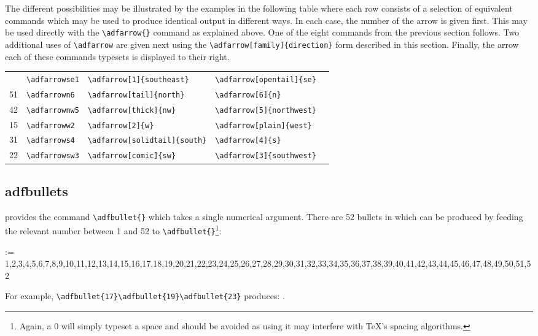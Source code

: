 \documentclass[10pt,british]{article}
\makeatletter
\newcommand{\adfsymset}{%
1,2,3,4,5,6,7,8,9,10,11,12,13,14,15,16,17,18,19,20,21,22,23,24,25,26,27,28,29,30,31,32,33,34,35,36,37,38,39,40,41,42,43,44,45,46,47,48,49,50,51,52}
\newcommand{\adfbulletshow}{%
	\def\tempa{52}%
	\@for \xx:=\adfsymset \do {%
		\ifx\tempa\xx
			\xx: \adfbullet{\xx}%
		\else
			\xx:	 \adfbullet{\xx}\\%
		\fi}}
\makeatother
\begin{document}
The different possibilities may be illustrated by the examples in the following table where each row consists of a selection of equivalent commands which may be used to produce identical output in different ways. In each case, the number of the arrow is given first. This may be used directly with the \verb|\adfarrow{}| command as explained above. One of the eight commands from the previous section follows. Two additional uses of \verb|\adfarrow| are given next using the \verb|\adfarrow[family]{direction}| form described in this section. Finally, the arrow each of these commands typesets is displayed to their right.
\begin{longtable}{lllll}
	\toprule\endhead
	\bottomrule\endfoot
		4	&	\verb|\adfarrowse1|	&	\verb|\adfarrow[1]{southeast}|				&	\verb|\adfarrow[opentail]{se}|		&	\adfarrow[opentail]{se}\\
		51	&	\verb|\adfarrown6|		&	\verb|\adfarrow[tail]{north}|				&	\verb|\adfarrow[6]{n}|						&	\adfarrow[6]{n}\\
		42	&	\verb|\adfarrownw5|	&	\verb|\adfarrow[thick]{nw}|					&	\verb|\adfarrow[5]{northwest}|		&	\adfarrow[5]{northwest}\\
		15	&	\verb|\adfarroww2|		&	\verb|\adfarrow[2]{w}|								&	\verb|\adfarrow[plain]{west}|		&	\adfarrow[plain]{west}\\
		31	&	\verb|\adfarrows4|		&	\verb|\adfarrow[solidtail]{south}|		&	\verb|\adfarrow[4]{s}|						&	\adfarrow[4]{s}\\
		22	&	\verb|\adfarrowsw3|	&	\verb|\adfarrow[comic]{sw}|					&	\verb|\adfarrow[3]{southwest}|		&	\adfarrow[3]{southwest}\\
\end{longtable}

\subsection{adfbullets}

 provides the command \verb|\adfbullet{}| which takes a single numerical argument. There are 52 bullets in  which can be produced by feeding the relevant number between 1 and 52 to \verb|\adfbullet{}|\footnote{Again, a 0 will simply typeset a space and should be avoided as using it may interfere with \TeX's spacing algorithms.}:
\begin{multicols}{4}
	\adfbulletshow
\end{multicols}

For example, \verb|\adfbullet{17}\adfbullet{19}\adfbullet{23}| produces: 	.
\end{document}
